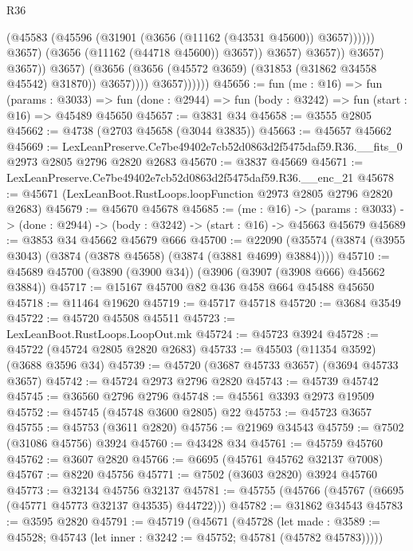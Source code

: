 \begin{lexlean}{R36}
\begin{coremodule}
                                            (@45583
                                              (@45596
                                                (@31901 (@3656 (@11162 (@43531 @45600)) @3657))))))
                                        @3657)
                                      (@3656 (@11162 (@44718 @45600)) @3657))
                                    @3657)
                                  @3657))
                              @3657)
                            @3657))
                        @3657)
                      (@3656 (@3656 (@45572 @3659) (@31853 (@31862 @34558 @45542) @31870)) @3657))))
                @3657))))))
@45656 := fun (me : @16) =>
  fun (params : @3033) =>
  fun (done : @2944) => fun (body : @3242) => fun (start : @16) => @45489 @45650
@45657 := @3831 @34
@45658 := @3555 @2805
@45662 := @4738 (@2703 @45658 (@3044 @3835))
@45663 := @45657 @45662
@45669 := LexLeanPreserve.Ce7be49402e7cb52d0863d2f5475daf59.R36.__fits_0
    @2973
    @2805
    @2796
    @2820
    @2683
@45670 := @3837 @45669
@45671 := LexLeanPreserve.Ce7be49402e7cb52d0863d2f5475daf59.R36.__enc_21
@45678 := @45671 (LexLeanBoot.RustLoops.loopFunction @2973 @2805 @2796 @2820 @2683)
@45679 := @45670 @45678
@45685 := (me : @16) ->
  (params : @3033) -> (done : @2944) -> (body : @3242) -> (start : @16) -> @45663 @45679
@45689 := @3853 @34 @45662 @45679 @666
@45700 := @22090 (@35574 (@3874 (@3955 @3043) (@3874 (@3878 @45658) (@3874 (@3881 @4699) @3884))))
@45710 := @45689 @45700 (@3890 (@3900 @34)) (@3906 (@3907 (@3908 @666) @45662 @3884))
@45717 := @15167 @45700 @82 @436 @458 @664 @45488 @45650
@45718 := @11464 @19620
@45719 := @45717 @45718
@45720 := @3684 @3549
@45722 := @45720 @45508 @45511
@45723 := LexLeanBoot.RustLoops.LoopOut.mk
@45724 := @45723 @3924
@45728 := @45722 (@45724 @2805 @2820 @2683)
@45733 := @45503 (@11354 @3592) (@3688 @3596 @34)
@45739 := @45720 (@3687 @45733 @3657) (@3694 @45733 @3657)
@45742 := @45724 @2973 @2796 @2820
@45743 := @45739 @45742
@45745 := @36560 @2796 @2796
@45748 := @45561 @3393 @2973 @19509
@45752 := @45745 (@45748 @3600 @2805) @22
@45753 := @45723 @3657
@45755 := @45753 (@3611 @2820)
@45756 := @21969 @34543
@45759 := @7502 (@31086 @45756) @3924
@45760 := @43428 @34
@45761 := @45759 @45760
@45762 := @3607 @2820
@45766 := @6695 (@45761 @45762 @32137 @7008)
@45767 := @8220 @45756
@45771 := @7502 (@3603 @2820) @3924 @45760
@45773 := @32134 @45756 @32137
@45781 := @45755 (@45766 (@45767 (@6695 (@45771 @45773 @32137 @43535) @44722)))
@45782 := @31862 @34543
@45783 := @3595 @2820
@45791 := @45719
    (@45671
      (@45728
        (let made : @3589 := @45528; @45743 (let inner : @3242 := @45752; @45781 (@45782 @45783)))))

\end{coremodule}
\end{lexlean}
